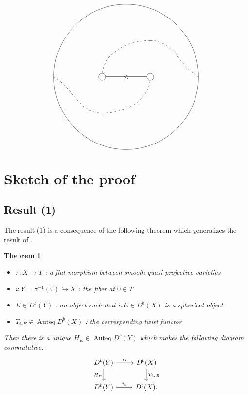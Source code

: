 \documentclass[a0,landscape]{a0poster}
\theoremstyle{plain}
\newtheorem{theorem}{Theorem}[section]
\theoremstyle{definition}
\DeclareMathOperator{\Auteq}{\mathrm{Auteq}}
\begin{document}
\begin{multicols}{3}
\begin{center}
\begin{displaymath}
\begin{tikzpicture}[scale=2.5]
                \draw (0+5, 1.5) circle[radius=1.5];
                \draw[thick] (-0.5+5, 1.5)--(0.5+5, 1.5);
                \draw(5, 1.5) node{$<$};


                \draw[dashed](-1.5+5, 1.5) to[out=-30,in=180](-0.5+5, 0.75);
                \draw[dashed](-0.5+5, 0.75) to[out=0,in=-90](0.5+5, 1.5);

                \draw[dashed](-0.5+5, 1.5) to[out=90,in=180](0.5+5, 2.25);
                \draw[dashed](0.5+5, 2.25) to[out=0,in=150](1.5+5, 1.5);


                \foreach \u in {-0.5, 0.5}
                    {
                        \filldraw[white] (\u+5, 1.5) circle (2pt);
                        \draw[black] (\u+5, 1.5) circle (2pt);
                    }
            \end{tikzpicture}
        \end{displaymath}
    \end{center}


    \section{Sketch of the proof}
    \subsection{Result (1)}
    The result (1) is a consequence of the following theorem which generalizes the result of \cite{MR2200048}.
    \begin{theorem}
        \quad
        \begin{itemize}
            \item $\pi \colon X \to T$ : a flat morphism between smooth quasi-projective varieties
            \item $i \colon Y = \pi^{-1}(0) \hookrightarrow X$ : the fiber at $0 \in T$
            \item $E \in D^b(Y)$ : an object such that $i_* E \in D^b(X)$ is a spherical object
            \item $T_{i_* E} \in \Auteq D^b(X)$ : the corresponding twist functor
        \end{itemize}
        Then there is a unique $H_E \in \Auteq D^b(Y)$ which makes the following diagram commutative:
        \begin{equation} \label{eq:cd2}
            \begin{tikzcd}
                D^b(Y) \arrow[r,"i_*"]\arrow[d, "H_E"'] & D^b(X) \arrow[d,"T_{i_* E}"]\\
                D^b(Y) \arrow[r, "i_*"]& D^b(X).
            \end{tikzcd}
        \end{equation}
    \end{theorem}

\end{multicols}
\end{document}
